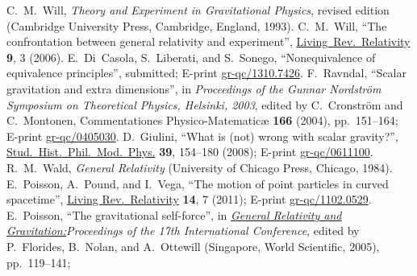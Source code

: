 \documentclass[a4paper,showkeys,aps,prd,reprint,nofootinbib,showpacs,twocolumn]{revtex4-1}
\theoremstyle{plain}
\begin{document}
{\small\begin{thebibliography}{99}

  C.~M.~Will, 
  \emph{Theory and Experiment in Gravitational Physics\/}, revised edition  
  (Cambridge University Press, Cambridge, England, 1993).
  C.~M.~Will,
  ``The confrontation between general relativity and experiment'',
  \href{http://www.livingreviews.org/lrr-2006-3}{Living~Rev.~Relativity} {\bf 9}, 3 (2006).
  E.~Di~Casola, S.~Liberati, and S.~Sonego, 
  ``Nonequivalence of equivalence principles'', submitted; 
  E-print \href{http://arxiv.org/abs/1310.7426}{gr-qc/1310.7426}.
  F.~Ravndal,
  ``Scalar gravitation and extra dimensions'', 
  in {\em Proceedings of the Gunnar Nordstr{\"o}m Symposium on Theoretical Physics, Helsinki, 2003\/}, 
  edited by C.~Cronstr\"om and C.~Montonen, 
  Commentationes Physico-Matematic{\ae} {\bf 166} (2004), pp.~151--164;
  E-print \href{http://arxiv.org/abs/gr-qc/0405030}{gr-qc/0405030}.
  D.~Giulini,
  ``What is (not) wrong with scalar gravity?'', 
  \href{http://dx.doi.org/10.1016/j.shpsb.2007.09.001}{Stud.~Hist.~Phil.~Mod.~Phys.} {\bf 39}, 154--180 (2008); 
  E-print \href{http://arxiv.org/abs/gr-qc/0611100}{gr-qc/0611100}.
  R.~M.~Wald,
  {\em General Relativity\/} 
  (University of Chicago Press, Chicago, 1984).
  E.~Poisson, A.~Pound, and I.~Vega,
  ``The motion of point particles in curved spacetime'', 
  \href{http://relativity.livingreviews.org/Articles/lrr-2011-7/}{Living Rev.\ Relativity} {\bf 14}, 7 (2011);   
E-print \href{http://arxiv.org/abs/arXiv:1102.0529}{gr-qc/1102.0529}.
  E.~Poisson,
  ``The gravitational self-force'', 
in \href{http://www.worldscientific.com/doi/abs/10.1142/9789812701688_0012}{\em General Relativity and Gravitation:}{\em Proceedings of the 17th International Conference\/}, edited by P.~Florides, B.~Nolan, and
A.~Ottewill (Singapore, World Scientific, 2005), pp.~119--141;   

\end{thebibliography}}
\end{document}
